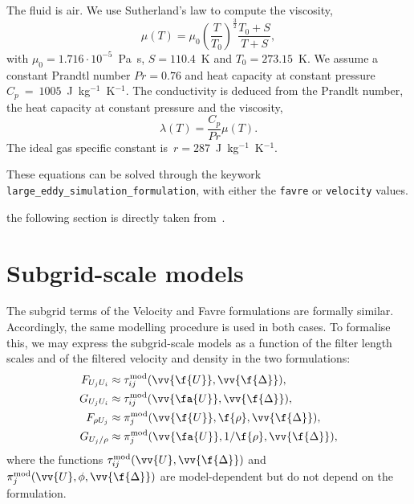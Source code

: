 The fluid is air. We use Sutherland's law \cite{sutherland1893lii} to compute the viscosity,
\begin{equation}
\mu(T) = \mu_0 \left(\frac{T}{T_0}\right)^{\frac{3}{2}} \frac{T_0 + S}{T + S},
\end{equation}
with $\mu_0 = 1.716\cdot 10^{-5}$~Pa~s, $S=110.4$~K and $T_0 = 273.15$~K.
We assume a constant Prandtl number $Pr = 0.76$ and heat capacity at
constant pressure $C_p~=~1005$~J~kg$^{-1}$~K$^{-1}$.
The conductivity is deduced from the Prandlt number, the heat capacity at
constant pressure and the viscosity,
\begin{equation}
\lambda(T) = \frac{C_p}{Pr} \mu(T).
\end{equation}
The ideal gas specific constant is~$r=287$~J~kg$^{-1}$~K$^{-1}$.


These equations can be solved through the keywork \texttt{large\_eddy\_simulation\_formulation}, with either the \texttt{favre} or \texttt{velocity} values.

the following section is directly taken from~\cite{dupuy2016,dupuy2017sft,dupuy2018study}.

\section{Subgrid-scale models}

The subgrid terms of the Velocity and Favre formulations are formally
similar. Accordingly, the same modelling procedure is used in both cases.
To formalise this, we may express the subgrid-scale models as a function
of the filter length scales and of the filtered velocity and density
in the two formulations:
\begin{align}
F_{U_j U_i} \approx{}& \tau_{ij}^{\mathrm{mod}}(\vv{\f{U}}, \vv{\f{\Delta}}), \\
G_{U_j U_i} \approx{}& \tau_{ij}^{\mathrm{mod}}(\vv{\fa{U}}, \vv{\f{\Delta}}), \\
F_{\rho U_j} \approx{}& \pi_{j}^{\mathrm{mod}}(\vv{\f{U}}, \f{\rho}, \vv{\f{\Delta}}), \\
G_{U_j/\rho} \approx{}& \pi_{j}^{\mathrm{mod}}(\vv{\fa{U}}, 1/\f{\rho}, \vv{\f{\Delta}}),
\end{align}%
where the functions $\tau_{ij}^{\mathrm{mod}}(\vv{U},\vv{\f{\Delta}})$ and
$\pi_j^{\mathrm{mod}}(\vv{U},\phi,\vv{\f{\Delta}})$ are model-dependent but do not depend on the formulation.

